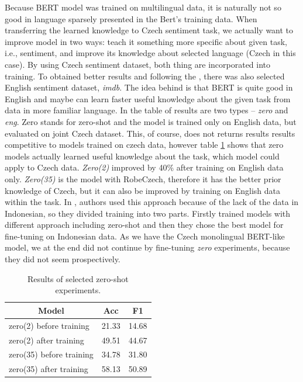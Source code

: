 \par
Because BERT model was trained on multilingual data, it is naturally not so good in language sparsely presented in the Bert's training data. When transferring the learned knowledge to Czech sentiment task, we actually want to improve model in two ways: teach it something more specific about given task, i.e., sentiment, and improve its knowledge about selected language (Czech in this case). By using Czech sentiment dataset, both thing are incorporated into training. To obtained better results and following the \citep{putra}, there was also selected English sentiment dataset, \textit{imdb}. The idea behind is that BERT is quite good in English and maybe can learn faster useful knowledge about the given task from data in more familiar language. In the table of results are two types -- \textit{zero} and \textit{eng}. Zero stands for zero-shot and the model is trained only on English data, but evaluated on joint Czech dataset. This, of course, does not returns results results competitive to models trained on czech data, however table \ref{tab:zero} shows that zero models actually learned useful knowledge about the task, which model could apply to Czech data. \textit{Zero(2)} improved by 40\% after training on English data only. \textit{Zero(35)} is the model with RobeCzech, therefore it has the better prior knowledge of Czech, but it can also be improved by training on English data within the task. In \citep{putra}, authors used this approach because of the lack of the data in Indonesian, so they divided training into two parts. Firstly trained models with different approach including zero-shot and then they chose the best model for fine-tuning on Indonesian data. As we have the Czech monolingual BERT-like model, we at the end did not continue by fine-tuning \textit{zero} experiments, because they did not seem prospectively.

\begin{table}[!h]
\begin{tabular}{|l|l|l|}
\hline
\multicolumn{1}{|c|}{Model} & \multicolumn{1}{c|}{Acc} & \multicolumn{1}{c|}{F1} \\ \hline
zero(2) before training     & 21.33                    & 14.68                   \\ \hline
zero(2) after training      & 49.51                    & 44.67                   \\ \hline
zero(35) before training    & 34.78                    & 31.80                   \\ \hline
zero(35) after training     & 58.13                    & 50.89                   \\ \hline
\end{tabular}
\caption{Results of selected zero-shot experiments.}
\label{tab:zero}
\end{table}

